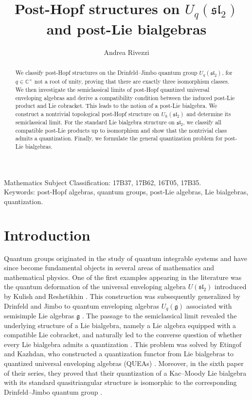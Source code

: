 \documentclass[11pt,english]{article}
\theoremstyle{definition}
\begin{document}
\title{\textbf{Post-Hopf structures on $U_q(\mathfrak{sl}_2)$ and post-Lie bialgebras}}
\author{Andrea Rivezzi}
\date{}
\maketitle
\vspace{-1cm}
\begin{abstract}
\noindent
We classify post-Hopf structures on the Drinfeld–Jimbo quantum group \(U_q(\mathfrak{sl}_2)\), for \(q\in\mathbb C^\times\) not a root of unity, proving that there are exactly three isomorphism classes. We then investigate the semiclassical limits of post-Hopf quantized universal enveloping algebras and derive a compatibility condition between the induced post-Lie product and Lie cobracket. This leads to the notion of a post-Lie bialgebra. We construct a nontrivial topological post-Hopf structure on \(U_\hbar(\mathfrak{sl}_2)\) and determine its semiclassical limit. For the standard Lie bialgebra structure on \(\mathfrak{sl}_2\), we classify all compatible post-Lie products up to isomorphism and show that the nontrivial class admits a quantization. Finally, we formulate the general quantization problem for post-Lie bialgebras.
\end{abstract}
 Mathematics Subject Classification: 17B37, 17B62, 16T05, 17B35.\\
Keywords: post-Hopf algebras, quantum groups, post-Lie algebras, Lie bialgebras, quantization.
\tableofcontents
\section*{Introduction}

Quantum groups originated in the study of quantum integrable
systems and have since become fundamental objects in several
areas of mathematics and mathematical physics. One of the
first examples appearing in the literature was the quantum deformation of the universal
enveloping algebra $U(\mathfrak{sl}_2)$ introduced by Kulish
and Reshetikhin \cite{KulishReshetikhin}. This construction
was subsequently generalized by Drinfeld and Jimbo to quantum
enveloping algebras $U_q(\mathfrak g)$ associated with
semisimple Lie algebras $\mathfrak g$ \cite{Drinfeld,Jimbo}.
The passage to the semiclassical limit revealed the underlying
structure of a Lie bialgebra, namely a Lie algebra equipped with
a compatible Lie cobracket, and naturally led to the converse
question of whether every Lie bialgebra admits a quantization \cite{DrinfeldProblems}.
This problem was solved by Etingof and Kazhdan, who constructed a quantization functor from Lie bialgebras to quantized universal enveloping algebras (QUEAs) \cite{EtingofKazhdan}. 
Moreover, in the sixth paper of their series, they proved
that their quantization of a Kac--Moody Lie bialgebra with
its standard quasitriangular structure is isomorphic to
the corresponding Drinfeld--Jimbo quantum group
\cite{EtingofKazhdanVI}.
\end{document}
